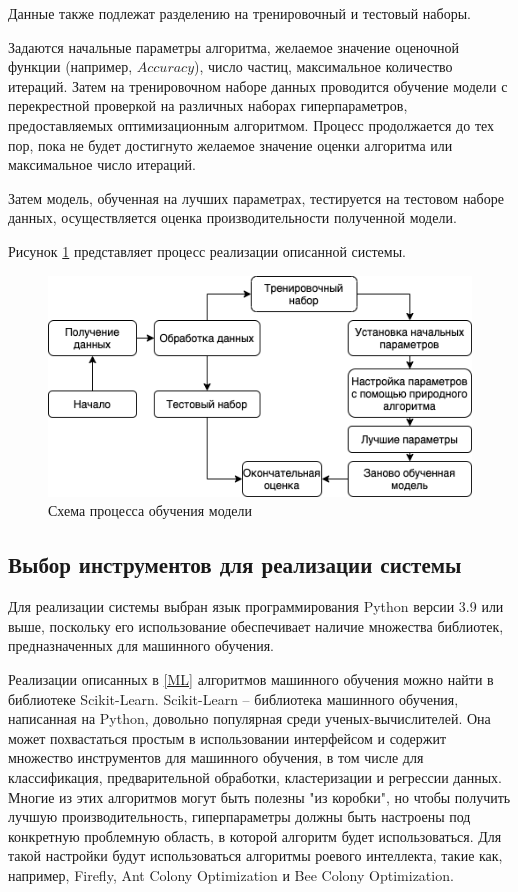 Данные также подлежат разделению на тренировочный и тестовый наборы.

Задаются начальные параметры алгоритма, желаемое значение оценочной функции (например, $Accuracy$),
число частиц, максимальное количество итераций. Затем на тренировочном наборе данных
проводится обучение модели с перекрестной проверкой на различных наборах
гиперпараметров, предоставляемых оптимизационным алгоритмом. Процесс продолжается
до тех пор, пока не будет достигнуто желаемое значение оценки алгоритма или
максимальное число итераций.

Затем модель, обученная на лучших параметрах, тестируется на тестовом наборе данных,
осуществляется оценка производительности полученной модели.

Рисунок \ref{scheme} представляет процесс реализации описанной системы.

\begin{figure}[H]
      \centering
      \includegraphics[width=140mm]{prog.png}
      \caption{Схема процесса обучения модели}
      \label{scheme}
\end{figure}

\subsection{Выбор инструментов для реализации системы}

Для реализации системы выбран язык программирования Python версии 3.9 или выше,
поскольку его использование обеспечивает наличие множества библиотек,
предназначенных для машинного обучения.

Реализации описанных в \ref{ML} алгоритмов машинного обучения
можно найти в библиотеке Scikit-Learn. Scikit-Learn --
библиотека машинного обучения, написанная на Python, довольно популярная
среди ученых-вычислителей. Она может похвастаться простым в использовании
интерфейсом и содержит множество инструментов для машинного обучения, в том числе
для классификация, предварительной обработки, кластеризации и регрессии данных.
Многие из этих алгоритмов могут быть полезны "из коробки", но чтобы получить
лучшую производительность, гиперпараметры должны быть настроены под конкретную
проблемную область, в которой алгоритм будет использоваться. Для такой настройки
будут использоваться алгоритмы роевого интеллекта, такие как, например, Firefly, Ant
Colony Optimization и Bee Colony Optimization.
